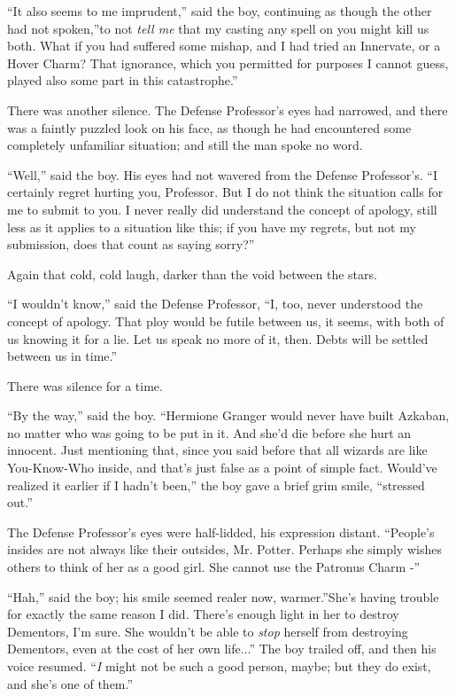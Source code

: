 ``It also seems to me imprudent,'' said the boy, continuing as though
the other had not spoken,''to not \emph{tell me} that my casting any
spell on you might kill us both. What if you had suffered some mishap,
and I had tried an Innervate, or a Hover Charm? That ignorance, which
you permitted for purposes I cannot guess, played also some part in this
catastrophe.''

There was another silence. The Defense Professor's eyes had narrowed,
and there was a faintly puzzled look on his face, as though he had
encountered some completely unfamiliar situation; and still the man
spoke no word.

``Well,'' said the boy. His eyes had not wavered from the Defense
Professor's. ``I certainly regret hurting you, Professor. But I do not
think the situation calls for me to submit to you. I never really did
understand the concept of apology, still less as it applies to a
situation like this; if you have my regrets, but not my submission, does
that count as saying sorry?''

Again that cold, cold laugh, darker than the void between the stars.

``I wouldn't know,'' said the Defense Professor, ``I, too, never
understood the concept of apology. That ploy would be futile between us,
it seems, with both of us knowing it for a lie. Let us speak no more of
it, then. Debts will be settled between us in time.''

There was silence for a time.

``By the way,'' said the boy. ``Hermione Granger would never have built
Azkaban, no matter who was going to be put in it. And she'd die before
she hurt an innocent. Just mentioning that, since you said before that
all wizards are like You-Know-Who inside, and that's just false as a
point of simple fact. Would've realized it earlier if I hadn't been,''
the boy gave a brief grim smile, ``stressed out.''

The Defense Professor's eyes were half-lidded, his expression distant.
``People's insides are not always like their outsides, Mr. Potter.
Perhaps she simply wishes others to think of her as a good girl. She
cannot use the Patronus Charm -''

``Hah,'' said the boy; his smile seemed realer now, warmer.''She's
having trouble for exactly the same reason I did. There's enough light
in her to destroy Dementors, I'm sure. She wouldn't be able to
\emph{stop} herself from destroying Dementors, even at the cost of her
own life...'' The boy trailed off, and then his voice resumed.
``\emph{I} might not be such a good person, maybe; but they do exist, and
she's one of them.''

